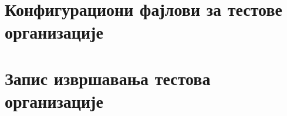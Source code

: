 \begin{appendices}
\chapter{Конфигурациони фајлови за тестове  организације}\label{chap:conf}

\newpage


\chapter{Запис извршавања тестова  организације}\label{chap:sum}


\end{appendices}